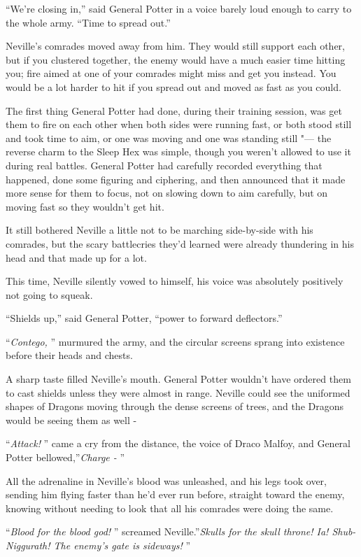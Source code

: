 ``We're closing in,'' said General Potter in a voice barely loud enough
to carry to the whole army. ``Time to spread out.''

Neville's comrades moved away from him. They would still support each
other, but if you clustered together, the enemy would have a much easier
time hitting you; fire aimed at one of your comrades might miss and get
you instead. You would be a lot harder to hit if you spread out and
moved as fast as you could.

The first thing General Potter had done, during their training session,
was get them to fire on each other when both sides were running fast, or
both stood still and took time to aim, or one was moving and one was
standing still "--- the reverse charm to the Sleep Hex was simple, though
you weren't allowed to use it during real battles. General Potter had
carefully recorded everything that happened, done some figuring and
ciphering, and then announced that it made more sense for them to focus,
not on slowing down to aim carefully, but on moving fast so they
wouldn't get hit.

It still bothered Neville a little not to be marching side-by-side with
his comrades, but the scary battlecries they'd learned were already
thundering in his head and that made up for a lot.

This time, Neville silently vowed to himself, his voice was absolutely
positively not going to squeak.

``Shields up,'' said General Potter, ``power to forward deflectors.''

``\emph{Contego,} '' murmured the army, and the circular screens sprang
into existence before their heads and chests.

A sharp taste filled Neville's mouth. General Potter wouldn't have
ordered them to cast shields unless they were almost in range. Neville
could see the uniformed shapes of Dragons moving through the dense
screens of trees, and the Dragons would be seeing them as well -

``\emph{Attack!} '' came a cry from the distance, the voice of Draco
Malfoy, and General Potter bellowed,''\emph{Charge -} ''

All the adrenaline in Neville's blood was unleashed, and his legs took
over, sending him flying faster than he'd ever run before, straight
toward the enemy, knowing without needing to look that all his comrades
were doing the same.

``\emph{Blood for the blood god!} '' screamed Neville.''\emph{Skulls for
the skull throne! Ia! Shub-Niggurath! The enemy's gate is sideways!} ''


